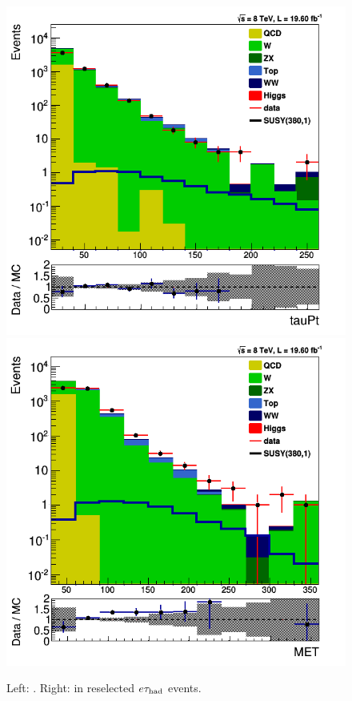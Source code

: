 \begin{figure}[htbp]
\centering
\includegraphics[angle=0,scale=0.35]{SelectionEleTau/TauPt.png}
\includegraphics[angle=0,scale=0.35]{SelectionEleTau/MET.png}
\caption{Left: \Tau\PT. Right: \MET in reselected $e\tau_{\rm had}$ events.}
\label{fig:datamceletau}
\end{figure}

